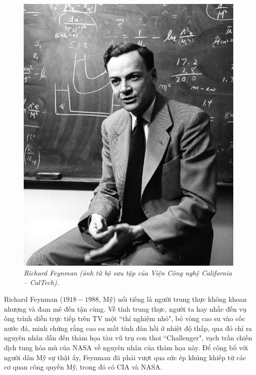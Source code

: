 \begin{multicols}{2}
	\begin{figure}[H]
		\vspace*{5pt}
		\centering
		\captionsetup{labelformat= empty, justification=centering}
		\includegraphics[width= 1\linewidth]{1a}
		\caption{\small\textit{\color{quantoan}Richard Feynman (ảnh từ bộ sưu tập của Viện Công nghệ California -- CalTech).}}
		\vspace*{-10pt}
	\end{figure}
	Richard Feynman ($1918-1988$, Mỹ) nổi tiếng là người trung thực không khoan nhượng và đam mê đến tận cùng. Về tính trung thực, người ta hay nhắc đến vụ ông trình diễn trực tiếp trên TV một ``thí nghiệm nhỏ", bỏ vòng cao su vào cốc nước đá, minh chứng rằng cao su mất tính đàn hồi ở nhiệt độ thấp, qua đó chỉ ra nguyên nhân dẫn đến thảm họa tàu vũ trụ con thoi ``Challenger", vạch trần chiến dịch tung hỏa mù của NASA về nguyên nhân của thảm họa này. Để công bố với người dân Mỹ sự thật ấy, Feynman đã phải vượt qua sức ép khủng khiếp từ các cơ quan công quyền Mỹ, trong đó có CIA và NASA. 

\end{multicols}
